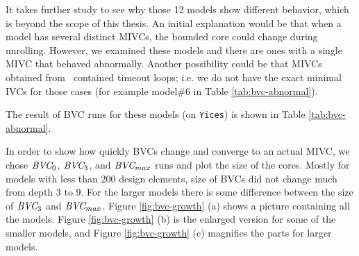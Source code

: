       It takes further study to see why those 12 models show different behavior, which is beyond the scope of this thesis. An initial explanation would be that when a model has several distinct MIVCs, the bounded core could change during unrolling. However, we examined these models and there are ones with a single MIVC that behaved abnormally. Another possibility could be that MIVCs obtained from \aivcalg ~contained timeout loops; i.e. we do not have the exact minimal IVCs for those cases (for example model\#6 in Table \ref{tab:bvc-abnormal}).

       The result of BVC runs for these models (on \texttt{Yices}) is shown in Table \ref{tab:bvc-abnormal}. 
       
       In order to show how quickly BVCs change and converge to an actual MIVC, we chose $\textit{BVC} _{0}$, $\textit{BVC} _{3}$, and $\textit{BVC} _{max}$  runs and plot the size of the cores. Mostly for models with less than 200 design elements, size of BVCs did not change much from depth 3 to 9. For the larger models there is some difference between the size of $\textit{BVC} _{3}$ and $\textit{BVC} _{max}$. Figure \ref{fig:bvc-growth} (a) shows a picture containing all the models. Figure  \ref{fig:bvc-growth} (b) is the enlarged version for some of the smaller models, and Figure  \ref{fig:bvc-growth} (c) magnifies the parts for larger models. 
       
